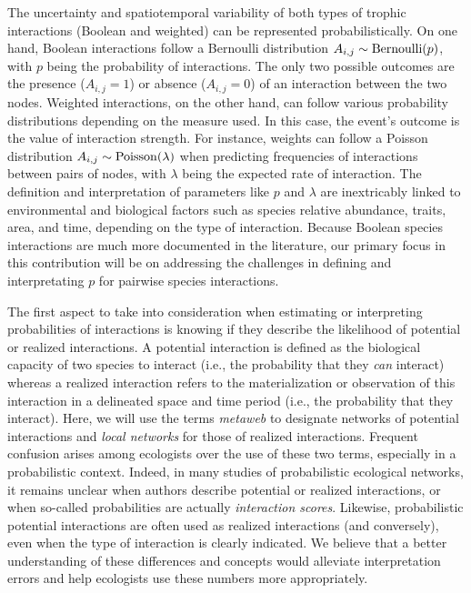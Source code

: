 \documentclass[10pt,oneside]{article}
\begin{document}
The uncertainty and spatiotemporal variability of both types of trophic
interactions (Boolean and weighted) can be represented
probabilistically. On one hand, Boolean interactions follow a Bernoulli
distribution \(A_{i,j} \sim {\rm Bernoulli}(p)\), with \(p\) being the
probability of interactions. The only two possible outcomes are the
presence (\(A_{i,j} = 1\)) or absence (\(A_{i,j} = 0\)) of an
interaction between the two nodes. Weighted interactions, on the other
hand, can follow various probability distributions depending on the
measure used. In this case, the event's outcome is the value of
interaction strength. For instance, weights can follow a Poisson
distribution \(A_{i,j} \sim {\rm Poisson}(\lambda)\) when predicting
frequencies of interactions between pairs of nodes, with \(\lambda\)
being the expected rate of interaction. The definition and
interpretation of parameters like \(p\) and \(\lambda\) are inextricably
linked to environmental and biological factors such as species relative
abundance, traits, area, and time, depending on the type of interaction.
Because Boolean species interactions are much more documented in the
literature, our primary focus in this contribution will be on addressing
the challenges in defining and interpretating \(p\) for pairwise species
interactions.

The first aspect to take into consideration when estimating or
interpreting probabilities of interactions is knowing if they describe
the likelihood of potential or realized interactions. A potential
interaction is defined as the biological capacity of two species to
interact (i.e., the probability that they \emph{can} interact) whereas a
realized interaction refers to the materialization or observation of
this interaction in a delineated space and time period (i.e., the
probability that they interact). Here, we will use the terms
\emph{metaweb} to designate networks of potential interactions and
\emph{local networks} for those of realized interactions. Frequent
confusion arises among ecologists over the use of these two terms,
especially in a probabilistic context. Indeed, in many studies of
probabilistic ecological networks, it remains unclear when authors
describe potential or realized interactions, or when so-called
probabilities are actually \emph{interaction scores}. Likewise,
probabilistic potential interactions are often used as realized
interactions (and conversely), even when the type of interaction is
clearly indicated. We believe that a better understanding of these
differences and concepts would alleviate interpretation errors and help
ecologists use these numbers more appropriately.
\end{document}
